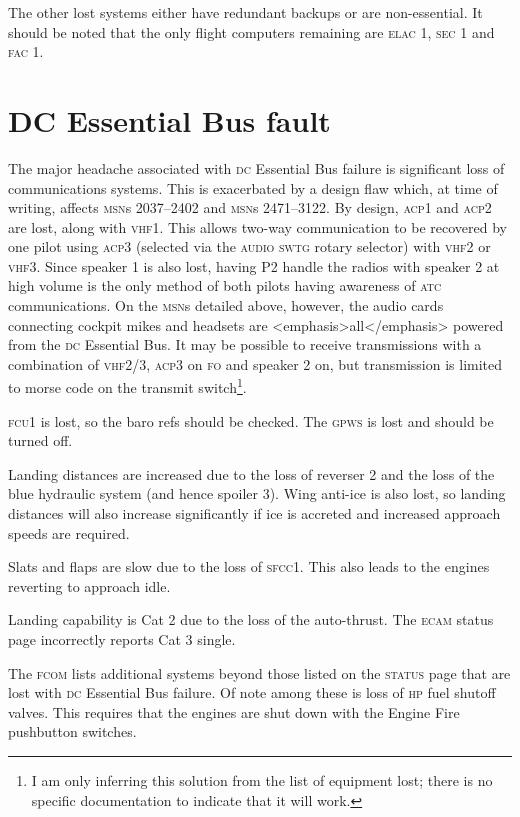 \documentclass[a5paper,11pt,twoside]{book}
\newcommand{\ac}[1]{{\scshape\MakeLowercase{#1}}}
\newcommand{\inlcite}[1]{{\ac{#1}}}
\newcommand{\multicite}[1]{%
  \nopagebreak
  \noindent{{\color{blue}\footnotesize[\inlcite{#1}]}}
}
\begin{document}
The other lost systems either have redundant backups or are non-essential. It
should be noted that the only flight computers remaining are \ac{ELAC} 1, \ac{SEC} 1 and
\ac{FAC} 1.

\multicite{\uline{ELEC}~DC~BUS~2~FAULT, FCOM~PRO.AEP.ELEC}


\section{DC Essential Bus fault}

The major headache associated with \ac{DC} Essential Bus failure is significant loss
of communications systems. This is exacerbated by a design flaw which, at time
of writing, affects \ac{MSN}s 2037–2402 and \ac{MSN}s 2471–3122. By design, \ac{ACP}1 and \ac{ACP}2
are lost, along with \ac{VHF}1. This allows two-way communication to be recovered by
one pilot using \ac{ACP}3 (selected via the \ac{AUDIO} \ac{SWTG} rotary selector) with \ac{VHF}2 or
\ac{VHF}3. Since speaker 1 is also lost, having P2 handle the radios with speaker 2
at high volume is the only method of both pilots having awareness of \ac{ATC}
communications. On the \ac{MSN}s detailed above, however, the audio cards connecting
cockpit mikes and headsets are <emphasis>all</emphasis> powered from the \ac{DC}
Essential Bus. It may be possible to receive transmissions with a combination of
\ac{VHF}2/3, \ac{ACP}3 on \ac{FO} and speaker 2 on, but transmission is limited to morse code
on the transmit switch\footnote{I am only inferring this solution from the list
of equipment lost; there is no specific documentation to indicate that it will
work.}.

\ac{FCU}1 is lost, so the baro refs should be checked. The \ac{GPWS} is lost and should be
turned off.

Landing distances are increased due to the loss of reverser 2 and the loss of
the blue hydraulic system (and hence spoiler 3). Wing anti-ice is also lost, so
landing distances will also increase significantly if ice is accreted and
increased approach speeds are required.

Slats and flaps are slow due to the loss of \ac{SFCC}1. This also leads to the
engines reverting to approach idle.

Landing capability is Cat 2 due to the loss of the auto-thrust. The \ac{ECAM} status
page incorrectly reports Cat 3 single.

The \ac{FCOM} lists additional systems beyond those listed on the \ac{STATUS} page that
are lost with \ac{DC} Essential Bus failure. Of note among these is loss of \ac{HP} fuel
shutoff valves. This requires that the engines are shut down with the Engine
Fire pushbutton switches.
\end{document}
